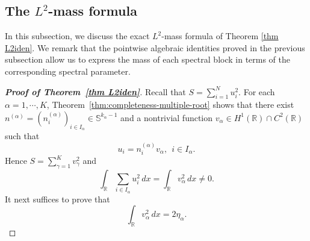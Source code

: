 \documentclass[11pt]{article}
\numberwithin{equation}{section}
\theoremstyle{definition}
\begin{document}
\subsection{The \(L^2\)-mass formula}
In this subsection, we discuss the exact \(L^2\)-mass formula of Theorem \ref{thm L2iden}. We remark that the pointwise algebraic identities proved in the previous subsection allow us to express the mass of each spectral block in terms of the corresponding spectral parameter.



\begin{proof}[\normalfont \bfseries Proof of Theorem~\ref{thm L2iden}]
Recall that
$S=\sum_{i=1}^N u_i^2$.
For each
\(\alpha=1,\cdots,K\),   Theorem~\ref{thm:completeness-multiple-root} shows that there exist
\(n^{(\alpha)}=(n_i^{(\alpha)})_{i\in I_\alpha}\in
\mathbb S^{k_\alpha-1}\) and a nontrivial function \(v_\alpha\in
H^1(\mathbb R)\cap C^2(\mathbb R)\) such that
\[
u_i=n_i^{(\alpha)}v_\alpha,\ \  i\in I_\alpha .
\]
Hence $S=\sum_{\gamma=1}^K v_\gamma^2$
and
\[
\int_{\mathbb R}\sum_{i\in I_\alpha}u_i^2\,dx
=
\int_{\mathbb R}v_\alpha^2\,dx\neq 0.
\]
It next suffices to prove that
\[
\int_{\mathbb R}v_\alpha^2\,dx=2\eta_\alpha .
\]


\end{proof}
\end{document}
